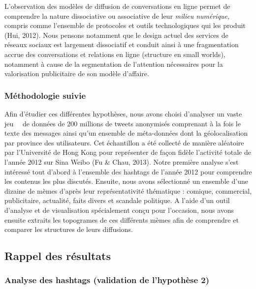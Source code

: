 L{\textquoteright}observation des mod\`eles de diffusion de conversations en ligne permet de comprendre la nature dissociative ou associative de leur \textit{milieu num\'erique, }compris comme l{\textquoteright}ensemble de protocoles et outils technologiques qui les produit (Hui, 2012). Nous pensons notamment que le design actuel des services de r\'eseaux sociaux est largement dissociatif et conduit ainsi \`a une fragmentation accrue des conversations et relations en ligne (structure en small worlds), notamment \`a cause de la segmentation de l{\textquoteright}attention n\'ecessaires pour la valorisation publicitaire de son mod\`ele d{\textquoteright}affaire.  


\subsubsection{M\'ethodologie suivie} 

Afin d{\textquoteright}\'etudier ces diff\'erentes hypoth\`eses, nous avons choisi d{\textquoteright}analyser un vaste jeu \ \ de donn\'ees de 200 millions de tweets anonymis\'es comprenant \`a la fois le texte des messages ainsi qu{\textquoteright}un ensemble de m\'eta-donn\'ees dont la g\'eolocalisation par province des utilisateurs. Cet \'echantillon a \'et\'e collect\'e de mani\`ere al\'eatoire par l{\textquoteright}Universit\'e de Hong Kong pour repr\'esenter de fa\c{c}on fid\`ele l{\textquoteright}activit\'e totale de l{\textquoteright}ann\'ee 2012 sur Sina Weibo (Fu \& Chau, 2013). Notre premi\`ere analyse s{\textquoteright}est int\'eress\'e tout d{\textquoteright}abord \`a l{\textquoteright}ensemble des hashtags de l{\textquoteright}ann\'ee 2012 pour comprendre les contenus les plus discut\'es. Ensuite, nous avons s\'electionn\'e un ensemble d{\textquoteright}une dizaine de m\`emes d{\textquoteright}apr\`es leur repr\'esentativit\'e th\'ematique : comique, commercial, publicitaire, actualit\'e, faits divers et scandale politique. A l{\textquoteright}aide d{\textquoteright}un outil d{\textquoteright}analyse et de visualisation sp\'ecialement con\c{c}u pour l{\textquoteright}occasion, nous avons ensuite extraits les topogrames de ces diff\'erents m\`emes afin de comprendre et comparer les structures de leurs diffusions.

\subsection{Rappel des r\'esultats} 
\subsubsection{Analyse des hashtags (validation de l{\textquoteright}hypoth\`ese 2)} 

